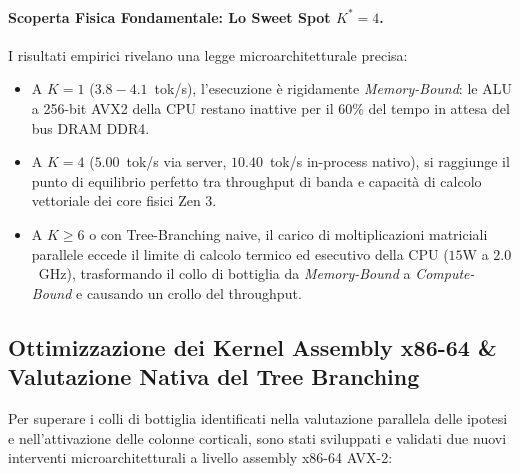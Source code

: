 \documentclass[10pt,a4paper]{article}
\theoremstyle{definition}
\begin{document}
\paragraph{Scoperta Fisica Fondamentale: Lo Sweet Spot $K^*=4$.}
I risultati empirici rivelano una legge microarchitetturale precisa:
\begin{itemize}[leftmargin=1.5em]
    \item A $K=1$ ($3.8 - 4.1$~tok/s), l'esecuzione è rigidamente \textit{Memory-Bound}: le ALU a 256-bit AVX2 della CPU restano inattive per il $60\%$ del tempo in attesa del bus DRAM DDR4.
    \item A $K=4$ ($5.00$~tok/s via server, $10.40$~tok/s in-process nativo), si raggiunge il punto di equilibrio perfetto tra throughput di banda e capacità di calcolo vettoriale dei core fisici Zen 3.
    \item A $K \ge 6$ o con Tree-Branching naive, il carico di moltiplicazioni matriciali parallele eccede il limite di calcolo termico ed esecutivo della CPU ($15$W a $2.0$~GHz), trasformando il collo di bottiglia da \textit{Memory-Bound} a \textit{Compute-Bound} e causando un crollo del throughput.
\end{itemize}

\subsection{Ottimizzazione dei Kernel Assembly x86-64 \& Valutazione Nativa del Tree Branching}
Per superare i colli di bottiglia identificati nella valutazione parallela delle ipotesi e nell'attivazione delle colonne corticali, sono stati sviluppati e validati due nuovi interventi microarchitetturali a livello assembly x86-64 AVX-2:
\end{document}
